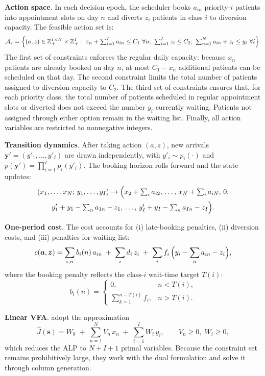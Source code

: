 \documentclass[sglanonrev]{informs4}
\begin{document}
\begin{APPENDICES}
\textbf{Action space}. In each decision epoch, the scheduler books $a_{in}$ priority-$i$ patients into appointment slots on day $n$ and diverts $z_i$ patients in class $i$ to diversion capacity. The feasible action set is:
\[
\mathcal{A}_s
=
\Bigl\{(a,z)\in \mathbb{Z}_+^{I \times N}\times \mathbb{Z}_+^{I}:\;
x_n+\textstyle\sum_{i=1}^I a_{in}\le C_1\ \forall n;\
\sum_{i=1}^I z_i\le C_2;\
\sum_{n=1}^N a_{in}+z_i\le y_i\ \forall i
\Bigr\}.
\]
The first set of constraints enforces the regular daily capacity: because $x_n$ patients are already booked on day $n$, at most $C_1-x_n$ additional patients can be scheduled on that day. The second constraint limits the total number of patients assigned to diversion capacity to $C_2$. The third set of constraints ensures that, for each priority class, the total number of patients scheduled in regular appointment slots or diverted does not exceed the number $y_i$ currently waiting. Patients not assigned through either option remain in the waiting list. Finally, all action variables are restricted to nonnegative integers.


\textbf{Transition dynamics}.
After taking action $(a,z)$, new arrivals $\boldsymbol{y}'=(y'_1,\ldots,y'_I)$
are drawn independently, with $y'_i\sim p_i(\cdot)$ and
$p(\boldsymbol{y}')=\prod_{i=1}^{I} p_i(y'_i)$.
The booking horizon rolls forward and the state updates:
\begin{equation*}
\begin{gathered}
(x_1,\ldots,x_N;\,y_1,\ldots,y_I)
\to
\Bigl(x_2+\textstyle\sum_i a_{i2},\,\ldots,\,
x_N+\textstyle\sum_i a_{iN},\,0;\\
y'_1+y_1-\textstyle\sum_n a_{1n}-z_1,\,\ldots,\,
y'_I+y_I-\textstyle\sum_n a_{In}-z_I\Bigr).
\end{gathered}
\end{equation*}

\textbf{One-period cost}.
The cost accounts for (i) late-booking penalties, (ii) diversion costs, and (iii) penalties for waiting list:
\[
c(\boldsymbol{a},\boldsymbol{z})
=\sum_{i,n} b_i(n)\,a_{in}
\;+\;\sum_{i} d_i\, z_i
\;+\;\sum_{i} f_i\,\Bigl(y_i-\sum_{n} a_{in}-z_i\Bigr),
\]
where the booking penalty reflects the class-$i$ wait-time target $T(i)$:
\[
b_i(n)=
\begin{cases}
0, & n<T(i),\\[3pt]
\displaystyle\sum_{k=1}^{n-T(i)} f_i, & n>T(i).
\end{cases}
\]

\textbf{Linear \ac{VFA}}.
\cite{patrick2008dynamic} adopt the approximation
\[
\hat{J}(\boldsymbol{s})
= W_0 \;+\; \sum_{n=1}^{N} V_n\,x_n \;+\; \sum_{i=1}^{I} W_i\,y_i,
\qquad V_n \ge 0,\; W_i \ge 0,
\]
which reduces the \ac{ALP} to $N+I+1$ primal variables. Because the constraint set remains prohibitively large, they work with the dual formulation and solve it through column generation.


\end{APPENDICES}
\end{document}
